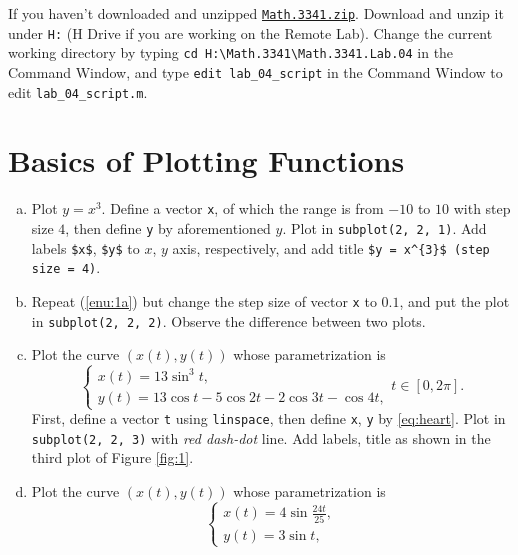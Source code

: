 If you haven't downloaded and unzipped \href{https://libaoj.in/courses/2021f/MATH3341/zip/Math.3341.zip}{\texttt{Math.3341.zip}}. Download and unzip it under \verb|H:| (H Drive if you are working on the Remote Lab). Change the current working directory by typing \verb|cd H:\Math.3341\Math.3341.Lab.04| in the Command Window, and type \verb|edit lab_04_script| in the Command Window to edit \verb|lab_04_script.m|.

\section{Basics of Plotting Functions}
\begin{enumerate}[(a)]
    \item \label{enu:1a} Plot $y = x^3$. Define a vector \verb|x|, of which the range is from $-10$ to $10$ with step size $4$, then define \verb|y| by aforementioned $y$. Plot in \verb|subplot(2, 2, 1)|. Add labels \verb|$x$|, \verb|$y$| to $x$, $y$ axis, respectively, and add title \verb|$y = x^{3}$ (step size = 4)|.
    \item Repeat (\ref{enu:1a}) but change the step size of vector \verb|x| to $0.1$, and put the plot in \verb|subplot(2, 2, 2)|. Observe the difference between two plots.
    \item \label{enu:1c} Plot the curve $(x(t), y(t))$ whose parametrization is
        \begin{equation}
        \label{eq:heart}
        \begin{cases}
        x(t) = 13 \sin^{3}{t}, \\
        y(t) = 13 \cos{t} - 5 \cos{2t} - 2 \cos{3t} - \cos{4t},
        \end{cases}
        t \in [0, 2\pi].
        \end{equation}
        First, define a vector \verb|t| using \verb|linspace|, then define \verb|x|, \verb|y| by \eqref{eq:heart}. Plot in \verb|subplot(2, 2, 3)| with \emph{red dash-dot} line. Add labels, title as shown in the third plot of Figure \ref{fig:1}.
    \item \label{enu:1c} Plot the curve $(x(t), y(t))$ whose parametrization is
        \begin{equation}
        \label{eq:fancy}
        \begin{cases}
        x(t) = 4 \sin{\frac{24t}{25}}, \\
        y(t) = 3 \sin{t},
        \end{cases}

\end{equation}
\end{enumerate}
